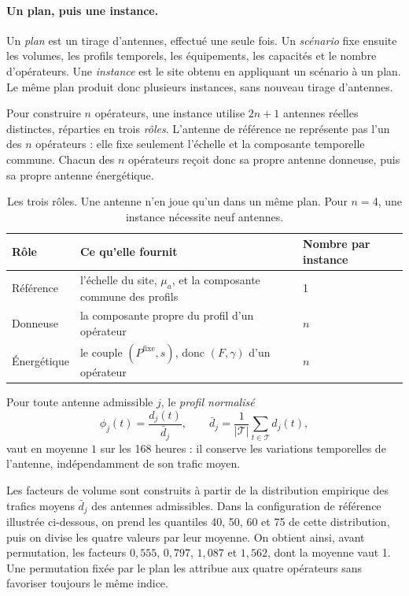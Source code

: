 \paragraph{Un plan, puis une instance.}
Un \emph{plan} est un tirage d'antennes, effectué une seule fois. Un
\emph{scénario} fixe ensuite les volumes, les profils temporels, les
équipements, les capacités et le nombre d'opérateurs. Une \emph{instance} est
le site obtenu en appliquant un scénario à un plan. Le même plan produit donc
plusieurs instances, sans nouveau tirage d'antennes.

Pour construire \(n\) opérateurs, une instance utilise \(2n+1\) antennes
réelles distinctes, réparties en trois \emph{rôles}.
L'antenne de référence ne représente pas l'un des \(n\) opérateurs : elle fixe
seulement l'échelle et la composante temporelle commune. Chacun des \(n\)
opérateurs reçoit donc sa propre antenne donneuse, puis sa propre antenne
énergétique.

\begin{table}[htbp]
\centering
\small
\begin{tabular}{p{}p{}p{}}
\hline
Rôle & Ce qu'elle fournit & Nombre par instance \\
\hline
Référence & l'échelle du site, \(\mu_a\), et la composante commune des profils & 1 \\
Donneuse & la composante propre du profil d'un opérateur & \(n\) \\
Énergétique & le couple \((P^{\mathrm{fixe}},s)\), donc \((F,\gamma)\)
d'un opérateur & \(n\) \\
\hline
\end{tabular}
\caption{Les trois rôles. Une antenne n'en joue qu'un dans un même plan.
Pour \(n=4\), une instance nécessite neuf antennes.}
\label{tab:roles_antennes}
\end{table}

Pour toute antenne admissible \(j\), le \emph{profil normalisé}
\begin{equation}
    \phi_j(t)=\frac{d_j(t)}{\bar d_j},
    \qquad
    \bar d_j=\frac{1}{|\mathcal T|}\sum_{t\in\mathcal T}d_j(t),
    \label{eq:profil_normalise}
\end{equation}
vaut en moyenne $1$ sur les 168 heures : il conserve les variations
temporelles de l'antenne, indépendamment de son trafic moyen.

Les facteurs de volume sont construits à partir de la distribution empirique
des trafics moyens \(\bar d_j\) des antennes admissibles. Dans la configuration
de référence illustrée ci-dessous, on prend les quantiles 40, 50, 60 et 75 de
cette distribution, puis on divise les quatre valeurs par leur moyenne. On
obtient ainsi, avant permutation,
les facteurs \(0{,}555\), \(0{,}797\), \(1{,}087\) et \(1{,}562\), dont la
moyenne vaut 1. Une permutation fixée par le plan les attribue aux quatre
opérateurs sans favoriser toujours le même indice.


